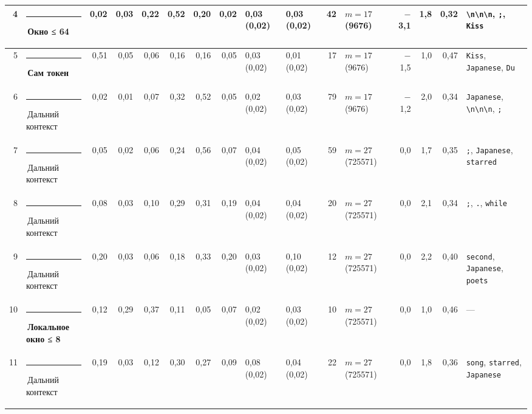 \documentclass[10pt]{article}
\begin{document}
\begin{minipage}{\linewidth}
\begin{center}
{\begin{tabular}{|r|l|r|r|r|r|r|r|l|l|r|l|r|r|r|l|}
4 & \textcolor[HTML]{EDA100}{\rule{0.62em}{0.62em}}\,\textbf{Окно ≤ 64} & 0,02 & 0,03 & 0,22 & 0,52 & 0,20 & 0,02 & 0,03 (0,02) & 0,03 (0,02) & 42 & $m{=}17$ (9676) & $-$3,1 & 1,8 & 0,32 & \texttt{\textvisiblespace{}\textbackslash{}n\textbackslash{}n\textbackslash{}n}, \texttt{\textvisiblespace{};}, \texttt{\textvisiblespace{}Kiss} \\ \hline
5 & \textcolor[HTML]{2A78D6}{\rule{0.62em}{0.62em}}\,\textbf{Сам токен} & 0,51 & 0,05 & 0,06 & 0,16 & 0,16 & 0,05 & 0,03 (0,02) & 0,01 (0,02) & 17 & $m{=}17$ (9676) & $-$1,5 & 1,0 & 0,47 & \texttt{\textvisiblespace{}Kiss}, \texttt{\textvisiblespace{}Japanese}, \texttt{\textvisiblespace{}Du} \\ \hline
6 & \textcolor[HTML]{C3C2B7}{\rule{0.62em}{0.62em}}\,Дальний контекст & 0,02 & 0,01 & 0,07 & 0,32 & 0,52 & 0,05 & 0,02 (0,02) & 0,03 (0,02) & 79 & $m{=}17$ (9676) & $-$1,2 & 2,0 & 0,34 & \texttt{\textvisiblespace{}Japanese}, \texttt{\textvisiblespace{}\textbackslash{}n\textbackslash{}n\textbackslash{}n}, \texttt{\textvisiblespace{};} \\ \hline
7 & \textcolor[HTML]{C3C2B7}{\rule{0.62em}{0.62em}}\,Дальний контекст & 0,05 & 0,02 & 0,06 & 0,24 & 0,56 & 0,07 & 0,04 (0,02) & 0,05 (0,02) & 59 & $m{=}27$ (725571) & 0,0 & 1,7 & 0,35 & \texttt{\textvisiblespace{};}, \texttt{\textvisiblespace{}Japanese}, \texttt{\textvisiblespace{}starred} \\ \hline
8 & \textcolor[HTML]{C3C2B7}{\rule{0.62em}{0.62em}}\,Дальний контекст & 0,08 & 0,03 & 0,10 & 0,29 & 0,31 & 0,19 & 0,04 (0,02) & 0,04 (0,02) & 20 & $m{=}27$ (725571) & 0,0 & 2,1 & 0,34 & \texttt{\textvisiblespace{};}, \texttt{\textvisiblespace{}.}, \texttt{\textvisiblespace{}while} \\ \hline
9 & \textcolor[HTML]{C3C2B7}{\rule{0.62em}{0.62em}}\,Дальний контекст & 0,20 & 0,03 & 0,06 & 0,18 & 0,33 & 0,20 & 0,03 (0,02) & 0,10 (0,02) & 12 & $m{=}27$ (725571) & 0,0 & 2,2 & 0,40 & \texttt{\textvisiblespace{}second}, \texttt{\textvisiblespace{}Japanese}, \texttt{\textvisiblespace{}poets} \\ \hline
10 & \textcolor[HTML]{1BAF7A}{\rule{0.62em}{0.62em}}\,\textbf{Локальное окно ≤ 8} & 0,12 & 0,29 & 0,37 & 0,11 & 0,05 & 0,07 & 0,02 (0,02) & 0,03 (0,02) & 10 & $m{=}27$ (725571) & 0,0 & 1,0 & 0,46 & — \\ \hline
11 & \textcolor[HTML]{C3C2B7}{\rule{0.62em}{0.62em}}\,Дальний контекст & 0,19 & 0,03 & 0,12 & 0,30 & 0,27 & 0,09 & 0,08 (0,02) & 0,04 (0,02) & 22 & $m{=}27$ (725571) & 0,0 & 1,8 & 0,36 & \texttt{\textvisiblespace{}song}, \texttt{\textvisiblespace{}starred}, \texttt{\textvisiblespace{}Japanese} \\ \hline

\end{tabular}}
\end{center}
\end{minipage}
\end{document}
